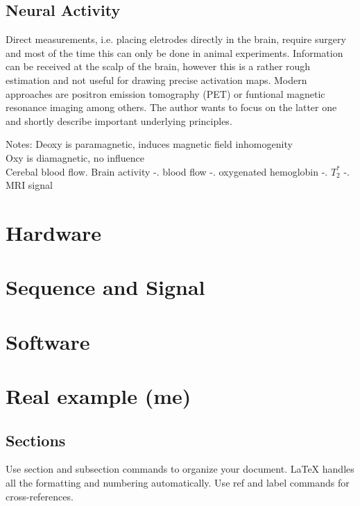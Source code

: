 \subsection{Neural Activity}
Direct measurements, i.e. placing eletrodes directly in the brain, require surgery and most of the time this can only be done in animal experiments. 
Information can be received at the scalp of the brain, however this is a rather rough estimation and not useful for drawing precise activation maps.\cite[6]{buxton}
Modern approaches are positron emission tomography (PET) or funtional magnetic resonance imaging among others. The author wants to focus on the latter one and shortly describe important underlying principles.



Notes:
Deoxy is paramagnetic, induces magnetic field inhomogenity \\
Oxy is diamagnetic, no influence \\
Cerebal blood flow. Brain activity -. blood flow -. oxygenated hemoglobin -. $T_2^*$ -. MRI signal

\section{Hardware}
\label{sec:hardware}

\section{Sequence and Signal}
\label{sec:sequenceSignal}

\section{Software}
\label{sec:software}

\section{Real example (me)}
\label{sec:example}

\printbibliography




\subsection{Sections}

Use section and subsection commands to organize your document. \LaTeX{} handles all the formatting and numbering automatically. Use ref and label commands for cross-references.

